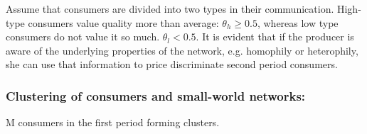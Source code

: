 \documentclass{article}
\numberwithin{figure}{section}
\numberwithin{table}{section}
\theoremstyle{indented}
\numberwithin{equation}{section} %
\begin{document}
    Assume that consumers are divided into two types in their communication. High-type consumers value quality more than average: $\theta_h\geq 0.5$, whereas low type consumers do not value it so much. $\theta_l < 0.5$.  It is evident that if the producer is aware of the underlying properties of the network, e.g. homophily or heterophily, she can use that information to price discriminate second period consumers.  
 \subsubsection{Clustering of consumers and small-world networks:}
M consumers in the first period forming clusters.




\newpage

\end{document}
